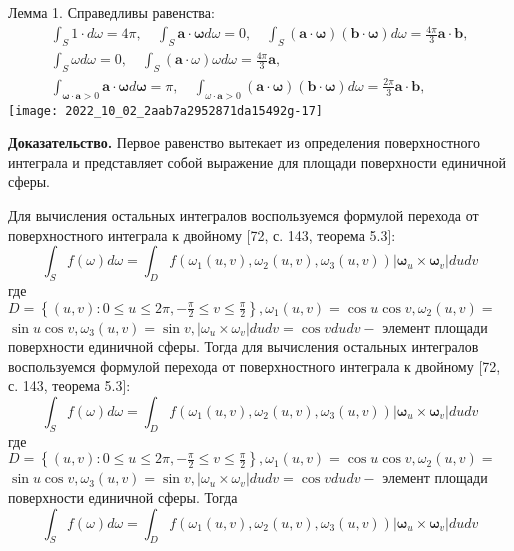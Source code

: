 Лемма 1. Справедливы равенства:
\[
    \begin{gathered}
        \int_{S} 1 \cdot d \omega=4 \pi, \quad \int_{S} \mathbf{a} \cdot \boldsymbol{\omega} d \omega=0,
        \quad \int_{S}(\mathbf{a} \cdot \boldsymbol{\omega})(\mathbf{b} \cdot \boldsymbol{\omega}) d
        \omega=\frac{4 \pi}{3} \mathbf{a} \cdot \mathbf{b}, \\
        \int_{S} \omega d \omega=0, \quad \int_{S}(\mathbf{a} \cdot \omega) \omega d
        \omega=\frac{4 \pi}{3} \mathbf{a}, \\
        \int_{\boldsymbol{\omega} \cdot \mathbf{a}>0} \mathbf{a} \cdot \boldsymbol{\omega} d
        \boldsymbol{\omega}=\pi, \quad \int_{\omega \cdot \mathbf{a}>0}(\mathbf{a} \cdot
        \boldsymbol{\omega})(\mathbf{b} \cdot \boldsymbol{\omega}) d \omega=\frac{2 \pi}{3} \mathbf{a} \cdot \mathbf{b},
    \end{gathered}
\]
\texttt{[image: 2022\_10\_02\_2aab7a2952871da15492g-17]}

\textbf{Доказательство.}
Первое равенство вытекает из определения поверхностного интеграла и представляет собой выражение для площади
поверхности единичной сферы.


Для вычисления остальных интегралов воспользуемся формулой перехода от поверхностного интеграла
к двойному [72, с. 143, теорема 5.3]:
\[
    \int_{S} f(\omega) d \omega=\int_{D} f\left(\omega_{1}(u, v), \omega_{2}(u, v),
    \omega_{3}(u, v)\right)\left|\boldsymbol{\omega}_{u} \times \boldsymbol{\omega}_{v}\right| d u d v
\]
где $D=\left\{(u, v): 0 \leqslant u \leqslant 2 \pi,-\frac{\pi}{2} \leqslant v \leqslant \frac{\pi}{2}\right\},
\omega_{1}(u, v)=\cos u \cos v, \omega_{2}(u, v)=$ $\sin u \cos v, \omega_{3}(u, v)=\sin v,\left|\omega_{u}
\times \omega_{v}\right| d u d v=\cos v d u d v-$ элемент площади поверхности единичной сферы.
Тогда для вычисления остальных интегралов воспользуемся формулой перехода от поверхностного интеграла
к двойному [72, с. 143, теорема 5.3]:
\[
    \int_{S} f(\omega) d \omega=\int_{D} f\left(\omega_{1}(u, v), \omega_{2}(u, v),
    \omega_{3}(u, v)\right)\left|\boldsymbol{\omega}_{u} \times \boldsymbol{\omega}_{v}\right| d u d v
\]
где $D=\left\{(u, v): 0 \leqslant u \leqslant 2 \pi,-\frac{\pi}{2} \leqslant v \leqslant
\frac{\pi}{2}\right\}, \omega_{1}(u, v)=\cos u \cos v, \omega_{2}(u, v)=$ $\sin u \cos v,
\omega_{3}(u, v)=\sin v,\left|\omega_{u} \times \omega_{v}\right| d u d v=\cos v d u d v-$
элемент площади поверхности единичной сферы.
Тогда
\[
    \int_{S} f(\omega) d \omega=\int_{D} f\left(\omega_{1}(u, v), \omega_{2}(u, v),
    \omega_{3}(u, v)\right)\left|\boldsymbol{\omega}_{u} \times \boldsymbol{\omega}_{v}\right| d u d v
\]




